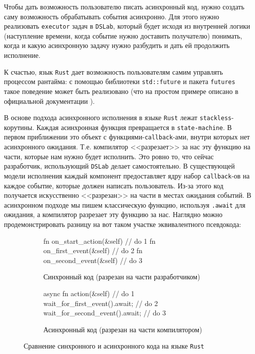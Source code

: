 Чтобы дать возможность пользователю писать асинхронный код, нужно создать саму возможность обрабатывать события асинхронно. Для этого нужно реализовать \texttt{executor} задач в \texttt{DSLab}, который будет исходя из внутренней логики (наступление времени, когда событие нужно доставить получателю) понимать, когда и какую асинхронную задачу нужно разбудить и дать ей продолжить исполнение. 

К счастью, язык \texttt{Rust} дает возможность пользователям самим управлять процессом рантайма: с помощью библиотеки \texttt{std::future}\cite{rust-std-future} и пакета \texttt{futures}\cite{rust-futures} такое поведение может быть реализовано (что на простом примере описано в официальной документации \cite{async-book}).

В основе подхода асинхронного исполнения в языке \texttt{Rust} лежат \texttt{stackless}-корутины. Каждая асинхронная функция превращается в \texttt{state-machine}. В первом приближении это объект с функциями-\texttt{callback}-ами, внутри которых нет асинхронного ожидания. Т.е. компилятор <<разрезает>> за нас эту функцию на части, которые нам нужно будет исполнить. Это ровно то, что сейчас разработчик, использующий \texttt{DSLab} делает самостоятельно. В существующей модели исполнения каждый компонент предоставляет ядру набор \texttt{callback}-ов на каждое событие, которые должен написать пользователь. Из-за этого код получается искусственно <<разрезан>> на части в местах ожидания событий. В асинхронном подходе мы пишем классическую функцию, используя \texttt{.await} для ожидания, а компилятор разрезает эту функцию за нас. Наглядно можно продемонстрировать разницу на вот таком участке эквивалентного псевдокода: 

\begin{figure}[H]
    \centering
    \begin{subfigure}[b]{0.45\linewidth}
        \small
        \centering
        \begin{rustcode}
fn on_start_action(&self) {
    // do 1
}
fn on_first_event(&self) {
    // do 2
}
fn on_second_event(&self) {
    // do 3
}
    \end{rustcode}
        \caption{Синхронный код (разрезан на части разработчиком)}
        \label{sync-async-example:sync}
    \end{subfigure}
    \hfill
    \begin{subfigure}[b]{0.51\linewidth}
        \small
        \centering
        \begin{rustcode}
async fn action(&self) {
    // do 1
    wait_for_first_event().await;
    // do 2 
    wait_for_second_event().await;
    // do 3
}
    \end{rustcode}
        \caption{Асинхронный код (разрезан на части компилятором)}
        \label{sync-async-example:async}
    \end{subfigure}
\caption{Сравнение синхронного и асинхронного кода на языке \texttt{Rust}}
\label{sync-async-example}
\end{figure}

